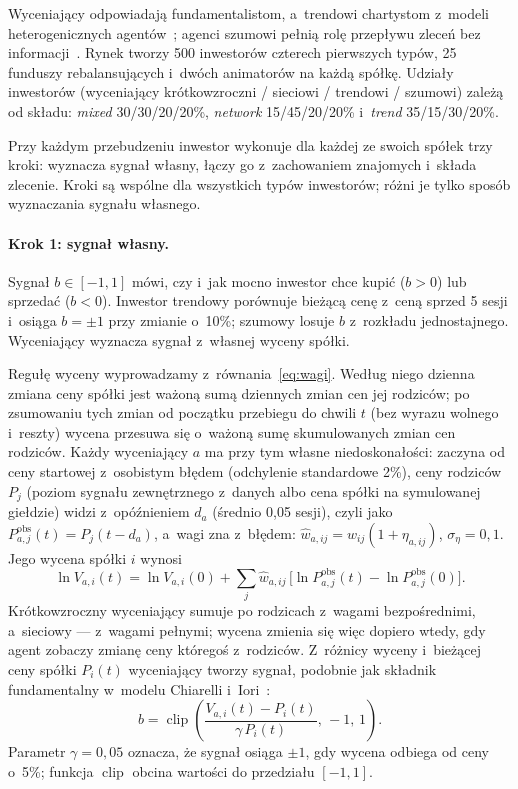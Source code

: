 \documentclass[11pt,a4paper]{article}
\newcommand{\cell}[1]{\textit{#1}}
\begin{document}
Wyceniający odpowiadają fundamentalistom, a~trendowi chartystom z~modeli heterogenicznych
agentów~\cite{brockhommes,lux}; agenci szumowi pełnią rolę przepływu zleceń bez informacji~\cite{farmer2005}.
Rynek tworzy 500 inwestorów czterech pierwszych typów, 25 funduszy rebalansujących i~dwóch animatorów na każdą
spółkę. Udziały inwestorów (wyceniający krótkowzroczni / sieciowi / trendowi / szumowi) zależą od składu:
\cell{mixed} 30/30/20/20\%, \cell{network} 15/45/20/20\% i~\cell{trend} 35/15/30/20\%.

Przy każdym przebudzeniu inwestor wykonuje dla każdej ze swoich spółek trzy kroki: wyznacza sygnał własny, łączy
go z~zachowaniem znajomych i~składa zlecenie. Kroki są wspólne dla wszystkich typów inwestorów; różni je tylko sposób
wyznaczania sygnału własnego.

\paragraph{Krok 1: sygnał własny.} Sygnał $b \in [-1, 1]$ mówi, czy i~jak mocno inwestor chce kupić ($b > 0$) lub
sprzedać ($b < 0$). Inwestor trendowy porównuje bieżącą cenę z~ceną sprzed 5 sesji i~osiąga $b = \pm 1$ przy zmianie
o~10\%; szumowy losuje $b$ z~rozkładu jednostajnego. Wyceniający wyznacza sygnał z~własnej wyceny spółki.

Regułę wyceny wyprowadzamy z~równania~\eqref{eq:wagi}. Według niego dzienna zmiana ceny spółki jest ważoną sumą
dziennych zmian cen jej rodziców; po zsumowaniu tych zmian od początku przebiegu do chwili $t$ (bez wyrazu wolnego
i~reszty) wycena przesuwa się o~ważoną sumę skumulowanych zmian cen rodziców. Każdy wyceniający $a$ ma przy tym
własne niedoskonałości: zaczyna od ceny startowej z~osobistym błędem (odchylenie standardowe 2\%), ceny rodziców
$P_j$ (poziom sygnału zewnętrznego z~danych albo cena spółki na symulowanej giełdzie) widzi z~opóźnieniem $d_a$
(średnio 0,05 sesji), czyli jako $P^{\mathrm{obs}}_{a,j}(t) = P_j(t - d_a)$, a~wagi zna z~błędem:
$\hat w_{a,ij} = w_{ij}(1 + \eta_{a,ij})$, $\sigma_\eta = 0{,}1$. Jego wycena spółki $i$ wynosi
\begin{equation}
  \ln V_{a,i}(t) = \ln V_{a,i}(0) + \sum_{j} \hat w_{a,ij}\,\bigl[\ln P^{\mathrm{obs}}_{a,j}(t)
    - \ln P^{\mathrm{obs}}_{a,j}(0)\bigr].
\end{equation}
Krótkowzroczny wyceniający sumuje po rodzicach z~wagami bezpośrednimi, a~sieciowy --- z~wagami pełnymi; wycena
zmienia się więc dopiero wtedy, gdy agent zobaczy zmianę ceny któregoś z~rodziców. Z~różnicy wyceny i~bieżącej ceny
spółki $P_i(t)$ wyceniający tworzy sygnał, podobnie jak składnik fundamentalny w~modelu Chiarelli
i~Iori~\cite{chiarella-iori}:
\begin{equation}
  b = \operatorname{clip}\!\left(\frac{V_{a,i}(t) - P_i(t)}{\gamma\, P_i(t)},\, -1,\, 1\right).
\end{equation}
Parametr $\gamma = 0{,}05$ oznacza, że sygnał osiąga $\pm 1$, gdy wycena odbiega od ceny o~5\%; funkcja
$\operatorname{clip}$ obcina wartości do przedziału $[-1, 1]$.
\end{document}
